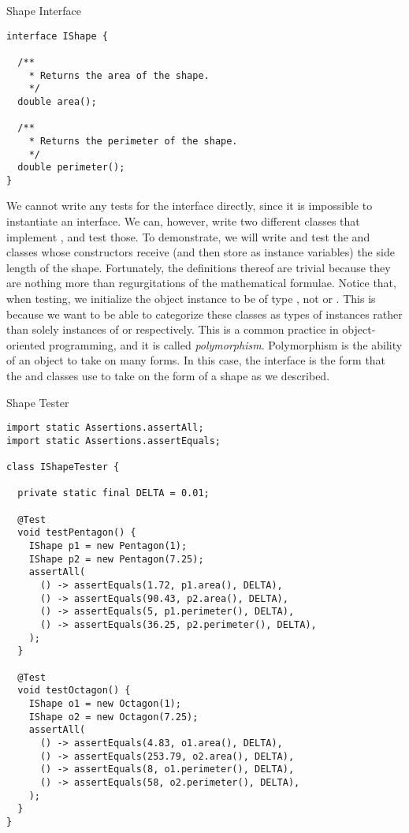 \begin{cl}{Shape Interface}
\begin{lstlisting}[language=MyJava]
interface IShape {

  /**
    * Returns the area of the shape.
    */
  double area();

  /**
    * Returns the perimeter of the shape.
    */
  double perimeter();
}
\end{lstlisting}
\end{cl}
We cannot write any tests for the  interface directly, since it is impossible to instantiate an interface. We can, however, write two different classes that implement , and test those. To demonstrate, we will write and test the  and  classes whose constructors receive (and then store as instance variables) the side length of the shape. Fortunately, the definitions thereof are trivial because they are nothing more than regurgitations of the mathematical formulae. Notice that, when testing, we initialize the object instance to be of type , not  or . This is because we want to be able to categorize these classes as types of  instances rather than solely instances of  or  respectively. This is a common practice in object-oriented programming, and it is called \textit{polymorphism}. Polymorphism is the ability of an object to take on many forms. In this case, the  interface is the form that the  and  classes use to take on the form of a shape as we described.

\begin{cl}{Shape Tester}
\begin{lstlisting}[language=MyJava]
import static Assertions.assertAll;
import static Assertions.assertEquals;

class IShapeTester {

  private static final DELTA = 0.01;
  
  @Test
  void testPentagon() {
    IShape p1 = new Pentagon(1);
    IShape p2 = new Pentagon(7.25);
    assertAll(
      () -> assertEquals(1.72, p1.area(), DELTA),
      () -> assertEquals(90.43, p2.area(), DELTA),
      () -> assertEquals(5, p1.perimeter(), DELTA),
      () -> assertEquals(36.25, p2.perimeter(), DELTA), 
    );
  }

  @Test
  void testOctagon() {
    IShape o1 = new Octagon(1);
    IShape o2 = new Octagon(7.25);
    assertAll(
      () -> assertEquals(4.83, o1.area(), DELTA),
      () -> assertEquals(253.79, o2.area(), DELTA),
      () -> assertEquals(8, o1.perimeter(), DELTA),
      () -> assertEquals(58, o2.perimeter(), DELTA), 
    );
  }
}
\end{lstlisting}
\end{cl}

